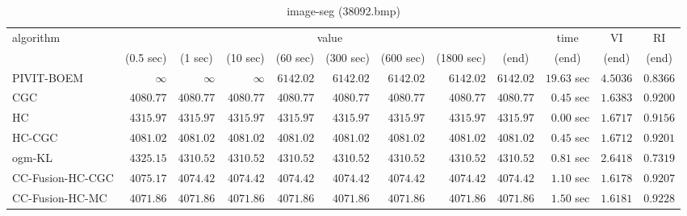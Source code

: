 \begin{table}[H]
\scriptsize
\centering
\caption{image-seg (38092.bmp)}
\label{tab:anytimetable-image-seg-38092.bmp}
\begin{tabular}{lrrrrrrrrrrr}
\toprule
           algorithm &                                   \multicolumn{8}{c}{value} & \multicolumn{1}{c}{time}    & \multicolumn{1}{c}{VI}  & \multicolumn{1}{c}{RI} \\  
\cmidrule(lr){2-9}\cmidrule(lr){10-10} \cmidrule(lr){11-11} \cmidrule(lr){12-12}   
                     & \multicolumn{1}{c}{(0.5 sec)} & \multicolumn{1}{c}{(1 sec)} & \multicolumn{1}{c}{(10 sec)} & \multicolumn{1}{c}{(60 sec)} & \multicolumn{1}{c}{(300 sec)} & \multicolumn{1}{c}{(600 sec)} & \multicolumn{1}{c}{(1800 sec)} & \multicolumn{1}{c}{(end)} & \multicolumn{1}{c}{(end)}    & \multicolumn{1}{c}{(end)}   & \multicolumn{1}{c}{(end)}  \\ \midrule 
          PIVIT-BOEM & $\infty$ & $\infty$ & $\infty$ & $      6142.02$ & $      6142.02$ & $      6142.02$ & $      6142.02$ & $      6142.02$ & $        19.63$ sec    & $       4.5036$  & $       0.8366$ \\ 
                 CGC & $      4080.77$ & $      4080.77$ & $      4080.77$ & $      4080.77$ & $      4080.77$ & $      4080.77$ & $      4080.77$ & $      4080.77$ & $         0.45$ sec    & $       1.6383$  & $       0.9200$ \\ 
                  HC & $      4315.97$ & $      4315.97$ & $      4315.97$ & $      4315.97$ & $      4315.97$ & $      4315.97$ & $      4315.97$ & $      4315.97$ & $         0.00$ sec    & $       1.6717$  & $       0.9156$ \\ 
              HC-CGC & $      4081.02$ & $      4081.02$ & $      4081.02$ & $      4081.02$ & $      4081.02$ & $      4081.02$ & $      4081.02$ & $      4081.02$ & $         0.45$ sec    & $       1.6712$  & $       0.9201$ \\ 
              ogm-KL & $      4325.15$ & $      4310.52$ & $      4310.52$ & $      4310.52$ & $      4310.52$ & $      4310.52$ & $      4310.52$ & $      4310.52$ & $         0.81$ sec    & $       2.6418$  & $       0.7319$ \\ 
    CC-Fusion-HC-CGC & $      4075.17$ & $      4074.42$ & $      4074.42$ & $      4074.42$ & $      4074.42$ & $      4074.42$ & $      4074.42$ & $      4074.42$ & $         1.10$ sec    & $       1.6178$  & $       0.9207$ \\ 
     CC-Fusion-HC-MC & $      4071.86$ & $      4071.86$ & $      4071.86$ & $      4071.86$ & $      4071.86$ & $      4071.86$ & $      4071.86$ & $      4071.86$ & $         1.50$ sec    & $       1.6181$  & $       0.9228$ \\ 

\end{tabular}
\end{table}
